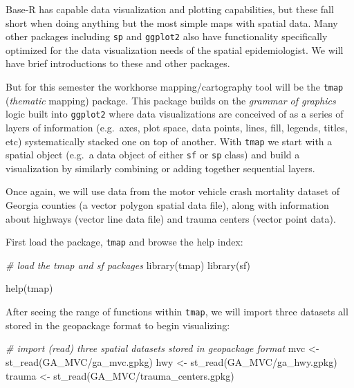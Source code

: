 \documentclass[
]{book}
\newenvironment{Shaded}{\begin{snugshade}}{\end{snugshade}}
\newcommand{\CommentTok}[1]{\textcolor[rgb]{0.56,0.35,0.01}{\textit{#1}}}
\newcommand{\FunctionTok}[1]{\textcolor[rgb]{0.00,0.00,0.00}{#1}}
\newcommand{\NormalTok}[1]{#1}
\newcommand{\OtherTok}[1]{\textcolor[rgb]{0.56,0.35,0.01}{#1}}
\newcommand{\StringTok}[1]{\textcolor[rgb]{0.31,0.60,0.02}{#1}}
\begin{document}
Base-R has capable data visualization and plotting capabilities, but these fall short when doing anything but the most simple maps with spatial data. Many other packages including \texttt{sp} and \texttt{ggplot2} also have functionality specifically optimized for the data visualization needs of the spatial epidemiologist. We will have brief introductions to these and other packages.

But for this semester the workhorse mapping/cartography tool will be the \texttt{tmap} (\emph{thematic} mapping) package. This package builds on the \emph{grammar of graphics} logic built into \texttt{ggplot2} where data visualizations are conceived of as a series of layers of information (e.g.~axes, plot space, data points, lines, fill, legends, titles, etc) systematically stacked one on top of another. With \texttt{tmap} we start with a spatial object (e.g.~a data object of either \texttt{sf} or \texttt{sp} class) and build a visualization by similarly combining or adding together sequential layers.

Once again, we will use data from the motor vehicle crash mortality dataset of Georgia counties (a vector polygon spatial data file), along with information about highways (vector line data file) and trauma centers (vector point data).

First load the package, \texttt{tmap} and browse the help index:

\begin{Shaded}
\begin{Highlighting}[]
\CommentTok{\# load the tmap and sf packages}
\FunctionTok{library}\NormalTok{(tmap)}
\FunctionTok{library}\NormalTok{(sf)}

\FunctionTok{help}\NormalTok{(}\StringTok{\textquotesingle{}tmap\textquotesingle{}}\NormalTok{)}
\end{Highlighting}
\end{Shaded}

After seeing the range of functions within \texttt{tmap}, we will import three datasets all stored in the geopackage format to begin visualizing:

\begin{Shaded}
\begin{Highlighting}[]
\CommentTok{\# import (read) three spatial datasets stored in geopackage format}
\NormalTok{mvc }\OtherTok{\textless{}{-}} \FunctionTok{st\_read}\NormalTok{(}\StringTok{\textquotesingle{}GA\_MVC/ga\_mvc.gpkg\textquotesingle{}}\NormalTok{)}
\NormalTok{hwy }\OtherTok{\textless{}{-}} \FunctionTok{st\_read}\NormalTok{(}\StringTok{\textquotesingle{}GA\_MVC/ga\_hwy.gpkg\textquotesingle{}}\NormalTok{)}
\NormalTok{trauma }\OtherTok{\textless{}{-}} \FunctionTok{st\_read}\NormalTok{(}\StringTok{\textquotesingle{}GA\_MVC/trauma\_centers.gpkg\textquotesingle{}}\NormalTok{)}
\end{Highlighting}
\end{Shaded}
\end{document}
